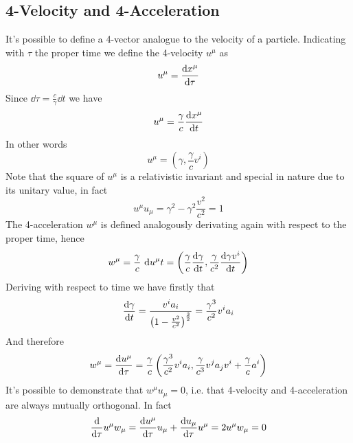 \documentclass[../electromagnetism.tex]{subfiles}
\begin{document}
\subsection{4-Velocity and 4-Acceleration}
It's possible to define a 4-vector analogue to the velocity of a particle. Indicating with $\tau$ the proper time we define the 4-velocity $u^\mu$ as
\begin{equation}
	u^\mu=\dv{x^\mu}{\tau}
	\label{eq:4velocity}
\end{equation}
Since $\dd\tau=\frac{c}{\gamma}\dd t$ we have
\begin{equation*}
	u^\mu=\frac{\gamma}{c}\dv{x^\mu}{t}
\end{equation*}
In other words
\begin{equation*}
	u^\mu=\left(\gamma,\frac{\gamma}{c}v^i\right)
\end{equation*}
Note that the square of $u^\mu$ is a relativistic invariant and special in nature due to its unitary value, in fact
\begin{equation*}
	u^\mu u_\mu=\gamma^2-\gamma^2\frac{v^2}{c^2}=1
\end{equation*}
The 4-acceleration $w^\mu$ is defined analogously derivating again with respect to the proper time, hence
\begin{equation}
	w^\mu=\frac{\gamma}{c}\ \mathrm{d}{u^\mu}{t}=\left( \frac{\gamma}{c}\dv{\gamma}{t},\frac{\gamma}{c^2}\dv{\gamma v^i}{t} \right)
	\label{eq:4acceleration}
\end{equation}
Deriving with respect to time we have firstly that
\begin{equation*}
	\dv{\gamma}{t}=\frac{v^ia_i}{\left( 1-\frac{v^2}{c^2} \right)^{\frac{3}{2}}}=\frac{\gamma^3}{c^2}v^ia_i
\end{equation*}
And therefore
\begin{equation}
	w^\mu=\dv{u^\mu}{\tau}=\frac{\gamma}{c}\left( \frac{\gamma^3}{c^2}v^ia_i,\frac{\gamma}{c^3}v^ja_jv^i+\frac{\gamma}{c}a^i \right)
	\label{eq:4acccomp}
\end{equation}
It's possible to demonstrate that $w^\mu u_\mu=0$, i.e. that 4-velocity and 4-acceleration are always mutually orthogonal. In fact
\begin{equation*}
	\dv{\tau}u^\mu w_\mu=\dv{u^\mu}{\tau}u_\mu+\dv{u_\mu}{\tau}u^\mu=2u^\mu w_\mu=0
\end{equation*}
\end{document}
